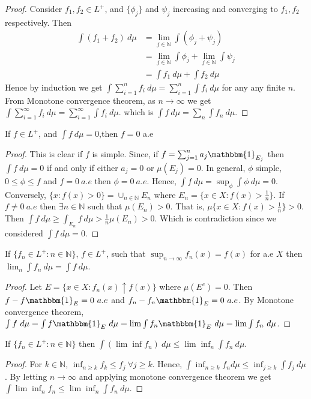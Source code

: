 \documentclass[a4paper,english,12pt]{article}   	%
\begin{document}
\begin{proof}
Consider $f_{1},f_{2} \in L^{+}$, and $\{\phi_{j}\}$ and $\psi_{j}$ increasing and converging to $f_{1},f_{2}$ respectively. Then 
\begin{align*} \int (f_{1}+f_{2}) ~d\mu &= \lim_{j \in \mathbb{N}} \int (\phi_{j} + \psi_{j}) \\ &= \lim_{j \in \mathbb{N}} \int \phi_{j} + \lim_{j \in \mathbb{N}} \int \psi_{j} \\ &= \int f_{1} ~d\mu + \int f_{2} ~d\mu \end{align*} Hence by induction we get $\int \sum_{i=1}^{n} f_{i} ~d\mu = \sum_{i=1}^{n} \int f_{i} ~d\mu$ for any any finite $n$. From Monotone convergence theorem, as $n \to \infty$ we get $\int \sum_{i=1}^{\infty} f_{i} ~d\mu = \sum_{i=1}^{\infty} \int f_{i} ~d\mu$. which is $\int f ~d\mu = \sum_{n} \int f_{n} ~d\mu$.
\end{proof}
\begin{prop}
If $f \in L^{+}$, and $\int f ~d\mu = 0$,then $f = 0$ a.e
\end{prop}
\begin{proof}
This is clear if $f$ is simple. Since, if $f = \sum_{j=1}^{n} a_{j} \mathbbm{1}_{E_{j}}$ then $\int f ~d\mu =0$ if and only if either $a_{j} = 0$ or $\mu(E_{j})=0$. In general, $\phi$ simple, $0 \leq \phi \leq f$ and $f =0 ~a.e$ then $\phi =0 ~a.e$. Hence, $\int f ~d\mu = \sup_{\phi} \int \phi ~d\mu = 0$. Conversely, $\{x \colon f(x)>0\} = \cup_{n \in \mathbb{N}} E_{n}$ where $E_{n} = \{x \in X \colon f(x) > \frac{1}{n}\}$. If $f \neq 0 ~a.e$ then $\exists n \in \mathbb{N}$ such that $\mu(E_{n}) > 0$. That is, $\mu\{x \in X \colon f(x) > \frac{1}{n}\} > 0$. Then $\int f ~d\mu \geq \int_{E_{n}} f ~d\mu > \frac{1}{n} \mu(E_{n}) > 0$. Which is contradiction since we considered $\int f ~d\mu = 0$.
\end{proof}
\begin{cor}
If $\{f_{n} \in L^{+} \colon n \in \mathbb{N} \}$, $f \in L^{+}$, such that $\sup_{n \to \infty} f_{n}(x) = f(x)$ for a.e $X$ then $\lim_{n} \int f_{n} ~d\mu = \int f ~d\mu$. 
\end{cor}
\begin{proof}
Let $E = \{x \in X \colon f_{n}(x) \uparrow f(x) \}$ where $\mu(E^{c}) = 0$. Then $f - f \mathbbm{1}_{E} = 0 ~a.e$ and $f_{n} - f_{n} \mathbbm{1}_{E} = 0 ~a.e$. By Monotone convergence theorem, $\int f ~d\mu = \int f \mathbbm{1}_{E} ~d\mu = \lim \int f_{n} \mathbbm{1}_{E} ~d\mu = \lim \int f_{n} ~d\mu$.
\end{proof}
\begin{lem}
If $\{f_{n} \in L^{+} \colon n \in \mathbb{N}\}$ then $\int (\lim \inf f_{n}) ~d\mu \leq \lim \inf_{n} \int f_{n} ~d\mu$.
\end{lem}
\begin{proof}
For $k \in \mathbb{N}$, $\inf_{n \geq k} f_{k} \leq f_{j} ~\forall j \geq k$. Hence, $\int \inf_{n \geq k} f_{n} d\mu \leq \inf_{j \geq k} \int f_{j} ~d\mu$. By letting $n \to \infty$ and applying monotone convergence theorem we get $\int \lim \inf_{n} f_{n} \leq \lim \inf_{n} \int f_{n} ~d\mu$.
\end{proof}
\end{document}
